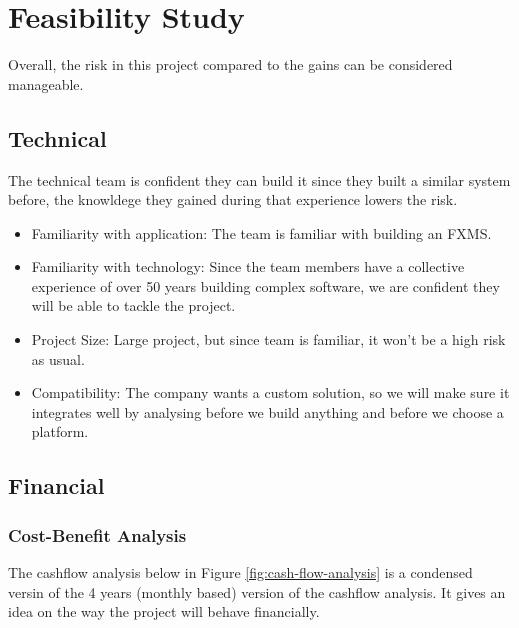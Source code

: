 \documentclass[a4paper]{report}
\begin{document}
\chapter{Feasibility Study}

Overall, the risk in this project compared to the gains can be considered manageable.

\section{Technical}

The technical team is confident they can build it since they built a similar system before, the knowldege they gained during that experience lowers the risk.

\begin{itemize}
    \item Familiarity with application: The team is familiar with building an FXMS.
    \item Familiarity with technology: Since the team members have a collective experience of over 50 years building complex software, we are confident they will be able to tackle the project.
    \item Project Size: Large project, but since team is familiar, it won't be a high risk as usual.
    \item Compatibility: The company wants a custom solution, so we will make sure it integrates well by analysing before we build anything and before we choose a platform.
\end{itemize}

\newpage

\section{Financial}

\subsection{Cost-Benefit Analysis}

The cashflow analysis below in Figure \ref{fig:cash-flow-analysis} is a condensed versin of the 4 years (monthly based) version of the cashflow analysis. It gives an idea on the way the project will behave financially.
\end{document}
